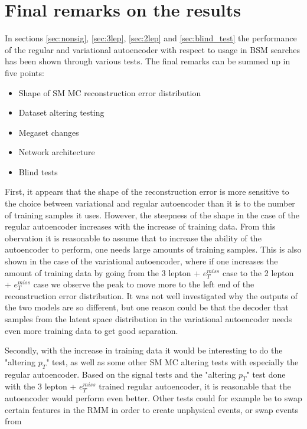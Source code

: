 \section{Final remarks on the results}
In sections \ref{sec:nonsig}, \ref{sec:3lep}, \ref{sec:2lep} and \ref{sec:blind_test} the performance 
of the regular and variational autoencoder with respect to usage in BSM 
searches has been shown through various tests. The final remarks can be summed 
up in five points:
\begin{itemize}
    
    \item Shape of SM MC reconstruction error distribution 
    \item Dataset altering testing
    \item Megaset changes 
    \item Network architecture
    \item Blind tests

\end{itemize}
First, it appears that the shape of the reconstruction error is more sensitive 
to the choice between variational and regular autoencoder than it is to the 
number of training samples it uses. However, the steepness of the shape in the 
case of the regular autoencoder increases with the increase of training data. 
From this obervation it is reasonable to assume that to increase the ability of 
the autoencoder to perform, one needs large amounts of training samples. This 
is also shown in the case of the variational autoencoder, where if one increases 
the amount of training data by going from the 3 lepton + $e_T^{miss}$ case to 
the 2 lepton + $e_T^{miss}$ case we observe the peak to move more to the left 
end of the reconstruction error distribution. It was not well investigated 
why the outputs of the two models are so different, but one reason could be 
that the decoder that samples from the latent space distribution in the 
variational autoencoder needs even more training data to get good separation. \par 
Secondly, with the increase in training data it would be interesting to do the 
"altering $p_T$" test, as well as some other SM MC altering tests with especially the 
regular autoencoder. Based on the signal tests and the "altering $p_T$" test done with 
the 3 lepton + $e_T^{miss}$ trained regular autoencoder, it is reasonable that the 
autoencoder would perform even better. Other tests could for example be to swap 
certain features in the RMM in order to create unphysical events, or swap events from
